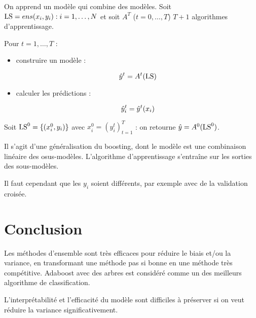 	On apprend un modèle qui combine des modèles. Soit $\text{LS} = ens{(x_i, y_i) : i = 1, \dots , N}$ et soit $A^T$ ($t = 0, \dots , T$) $T + 1$ algorithmes d'apprentissage.
	
	Pour $t = 1, \dots , T$ :
	
	\begin{itemize}
		\item construire un modèle :
		
		$$\hat{y}^t = A^t(\text{LS})$$
		
		\item calculer les prédictions :
		
		$$\hat{y}_i^t = \hat{y}^t (x_i)$$
	\end{itemize}
	
	Soit $\text{LS}^0 = \lbrace (x_i^0, y_i) \rbrace$ avec $x_i^0 = (y_i^t)^T_{t = 1}$ : on retourne $\hat{y} = A^0(\text{LS}^0)$.
	
	Il s'agit d'une généralisation du boosting, dont le modèle est une combinaison linéaire des osus-modèles. L'algorithme d'apprentissage s'entraîne sur les sorties des sous-modèles.
	
	
	Il faut cependant que les $y_i$ soient différents, par exemple avec de la validation croisée.
	
	
\section{Conclusion}

Les méthodes d'ensemble sont très efficaces pour réduire le biais et/ou la variance, en transformant une méthode pas si bonne en une méthode très compétitive. Adaboost avec des arbres est considéré comme un des meilleurs algorithme de classification.

L'interprétabilité et l'efficacité du modèle sont difficiles à préserver si on veut réduire la variance significativement.